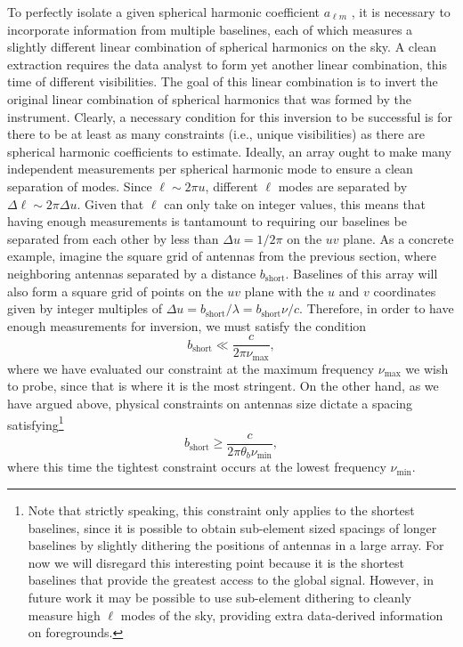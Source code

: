 \documentclass[twocolumn,apj,numberedappendix]{emulateapj}
\begin{document}
To perfectly isolate a given spherical harmonic coefficient $a_{\ell m}$ , it is necessary to incorporate information from multiple baselines, each of which measures a slightly different linear combination of spherical harmonics on the sky. A clean extraction requires the data analyst to form yet another linear combination, this time of different visibilities. The goal of this linear combination is to invert the original linear combination of spherical harmonics that was formed by the instrument. Clearly, a necessary condition for this inversion to be successful is for there to be at least as many constraints (i.e., unique visibilities) as there are spherical harmonic coefficients to estimate. Ideally, an array ought to make many independent measurements per spherical harmonic mode to ensure a clean separation of modes.  Since $\ell \sim 2 \pi u$, different $\ell$ modes are separated by $\Delta \ell \sim 2 \pi \Delta u$.  Given that $\ell$ can only take on integer values, this means that having enough measurements is tantamount to requiring our baselines be separated from each other by less than $\Delta u = 1/ 2 \pi$ on the $uv$ plane.  As a concrete example, imagine the square grid of antennas from the previous section, where neighboring antennas separated by a distance $b_\textrm{short}$.  Baselines of this array will also form a square grid of points on the $uv$ plane with the $u$ and $v$ coordinates given by integer multiples of $\Delta u = b_\textrm{short} / \lambda = b_\textrm{short} \nu / c$.  Therefore, in order to have enough measurements for inversion, we must satisfy the condition
\begin{equation}
\label{eq:WantAll}
b_\textrm{short} \ll \frac{c}{2 \pi \nu_\textrm{max}},
\end{equation}
where we have evaluated our constraint at the maximum frequency $\nu_\textrm{max}$ we wish to probe, since that is where it is the most stringent.  On the other hand, as we have argued above, physical constraints on antennas size dictate a spacing satisfying\footnote{Note that strictly speaking, this constraint only applies to the shortest baselines, since it is possible to obtain sub-element sized spacings of longer baselines by slightly dithering the positions of antennas in a large array. For now we will disregard this interesting point because it is the shortest baselines that provide the greatest access to the global signal. However, in future work it may be possible to use sub-element dithering to cleanly measure high $\ell$ modes of the sky, providing extra data-derived information on foregrounds.}
\begin{equation}
\label{eq:AntSize}
b_\textrm{short} \ge \frac{c}{2 \pi \theta_b \nu_\textrm{min}},
\end{equation}
where this time the tightest constraint occurs at the lowest frequency $\nu_\textrm{min}$.
\end{document}
